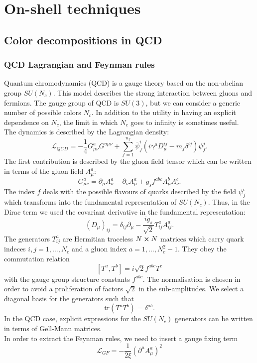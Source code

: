 \chapter{On-shell techniques}	\label{onshellamp}

\section{Color decompositions in QCD}
\subsection{QCD Lagrangian and Feynman rules}
Quantum chromodynamics (QCD) is a gauge theory based on the non-abelian group $SU(N_c)$. This model describes the strong interaction between gluons and fermions. The gauge group of QCD is $SU(3)$, but we can consider a generic number of possible colors $N_c$. In addition to the utility in having an explicit dependence on $N_c$, the limit in which $N_c$ goes to infinity is sometimes useful.\\
The dynamics is described by the Lagrangian density:
$$
	\mathcal{L}_{QCD}=-\frac{1}{4} G^{a}_{\mu\nu} G^{a\mu\nu}+\sum_{f=1}^{n_f} \bar \psi_f^{i} \left(i\gamma^\mu D_\mu^{i j}-m_f \delta^{i j}\right)\psi_f^j.
$$
The first contribution is described by the gluon field tensor which can be written in terms of the gluon field $A_\mu^a$:
$$
	G_{\mu\nu}^a=\partial_\mu A_\nu^a-\partial_\nu A_\mu^a+g_s f^{abc} A_{\mu}^b A_\nu^c.
$$
The index $f$ deals with the possible flavours of quarks described by the field $\psi_f^i$ which transforms into the fundamental representation of $SU(N_c)$. Thus, in the Dirac term we used the covariant derivative in the fundamental representation:
$$
	(D_\mu)_{ij}=\delta_{ij}\partial_\mu-\frac{ig_s}{\sqrt2} T^a_{ij} A^a_{ij}.
$$
The generators $T^a_{ij}$ are Hermitian traceless $N\cross N$ matrices which carry quark indeces $i,j=1,\dots,N_c$ and a gluon index $a=1,\dots, N_c^2-1$. They obey the commutation relation
$$
	[T^a,T^b]=i\sqrt{2}f^{abc}T^c
$$
with the gauge group structure constants $f^{abc}$. The normalisation is chosen in order to avoid a proliferation of factors $\sqrt{2}$ in the sub-amplitudes. We select a diagonal basis for the generators such that
$$
	\text{tr}\left(T^a T^b\right)=\delta^{ab}.
$$
In the QCD case, explicit expressions for the $SU(N_c)$ generators can be written in terms of Gell-Mann matrices.\\
In order to extract the Feynman rules, we need to insert a gauge fixing term
$$
	\mathcal{L}_{GF}=-\frac{1}{2\xi} (\partial^\mu A_\mu^a)^2
$$
